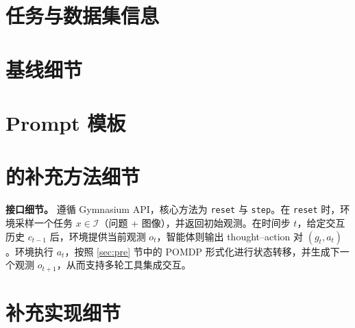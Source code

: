\clearpage
\setcounter{page}{1}
\maketitlesupplementary

\section{任务与数据集信息}
\label{app:data}


\section{基线细节}
\label{app:baseline}


\section{Prompt 模板}
\label{app:prompt}


\section{\env{} 的补充方法细节}
\label{app:method}
\noindent\textbf{接口细节。}
\env{} 遵循 Gymnasium API，核心方法为 \texttt{reset} 与 \texttt{step}。在 \texttt{reset} 时，环境采样一个任务 \(x \in \mathcal{I}\)（问题 + 图像），并返回初始观测。在时间步 \(t\)，给定交互历史 \(c_{t-1}\) 后，环境提供当前观测 \(o_t\)，智能体则输出 thought–action 对 \((g_t, a_t)\)。环境执行 \(a_t\)，按照 \ref{sec:pre} 节中的 POMDP 形式化进行状态转移，并生成下一个观测 \(o_{t+1}\)，从而支持多轮工具集成交互。


\section{补充实现细节}
\label{app:implementation}

